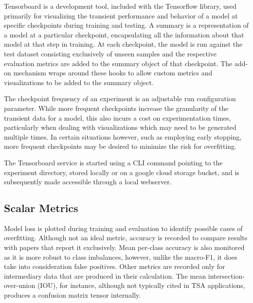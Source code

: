 \documentclass[../../fyp.tex]{subfiles}
\begin{document}
Tensorboard is a development tool, included with the Tensorflow library, used primarily for visualizing the transient performance and behavior of a model at specific checkpoints during training and testing. A summary is a representation of a model at a particular checkpoint, encapsulating all the information about that model at that step in training. At each checkpoint, the model is run against the test dataset consisting exclusively of unseen samples and the respective evaluation metrics are added to the summary object of that checkpoint. The add-on mechanism wraps around these hooks to allow custom metrics and visualizations to be added to the summary object.

 The checkpoint frequency of an experiment is an adjustable run configuration parameter. While more frequent checkpoints increase the granularity of the transient data for a model, this also incurs a cost on experimentation times, particularly when dealing with visualizations which may need to be generated multiple times. In certain situations however, such as employing early stopping, more frequent checkpoints may be desired to minimize the risk for overfitting.

The Tensorboard service is started using a CLI command pointing to the experiment directory, stored locally or on a google cloud storage bucket, and is subsequently made accessible through a local webserver.   

\subsection{Scalar Metrics}
Model loss is plotted during training and evaluation to identify possible cases of overfitting. Although not an ideal metric, accuracy is recorded to compare results with papers that report it exclusively. Mean per-class accuracy is also monitored as it is more robust to class imbalances, however, unlike the macro-F1, it does take into consideration false positives. Other metrics are recorded only for intermediary data that are produced in their calculation. The mean intersection-over-union (IOU), for instance, although not typically cited in TSA applications, produces a confusion matrix tensor internally.
\end{document}
